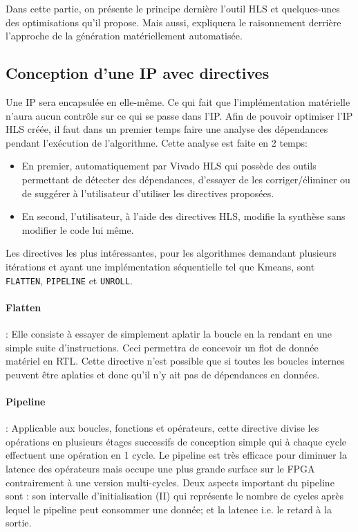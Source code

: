 \documentclass[12pt,a4paper]{article}
\begin{document}
Dans cette partie, on présente le principe dernière l'outil HLS et quelques-unes des optimisations qu'il propose. Mais aussi, expliquera le raisonnement derrière l'approche de la génération matériellement automatisée.

\subsection{Conception d'une IP avec directives}
Une IP sera encapsulée en elle-même. Ce qui fait que l'implémentation matérielle n'aura aucun contrôle sur ce qui se passe dans l'IP.
Afin de pouvoir optimiser l'IP HLS créée, il faut dans un premier temps faire une analyse des dépendances pendant l'exécution de l'algorithme. Cette analyse est faite en 2 temps: 
\begin{itemize}
\item En premier, automatiquement par Vivado HLS qui possède des outils permettant de détecter des dépendances, d'essayer de les corriger/éliminer ou de suggérer à l'utilisateur d'utiliser les directives proposées.
\item En second, l'utilisateur, à l'aide des directives HLS, modifie la synthèse sans modifier le code lui même.
\end{itemize}
 Les directives les plus intéressantes, pour les algorithmes demandant plusieurs itérations et ayant une implémentation séquentielle tel que Kmeans, sont \texttt{FLATTEN}, \texttt{PIPELINE} et \texttt{UNROLL}.
 
\paragraph{Flatten} : Elle consiste à essayer de simplement aplatir la boucle en la rendant en une simple suite d'instructions. Ceci permettra de concevoir un flot de donnée matériel en RTL. Cette directive n'est possible que si toutes les boucles internes peuvent être aplaties et donc qu'il n'y ait pas de dépendances en données.
\paragraph{Pipeline} : Applicable aux boucles, fonctions et opérateurs, cette directive divise les opérations en plusieurs étages successifs de conception simple qui à chaque cycle effectuent une opération en 1 cycle. Le pipeline est très efficace pour diminuer la latence des opérateurs mais occupe une plus grande surface sur le FPGA contrairement à une version multi-cycles. Deux aspects important du pipeline sont : son intervalle d'initialisation (II) qui représente le nombre de cycles après lequel le pipeline peut consommer une donnée; et la latence i.e. le retard à la sortie.
\end{document}
